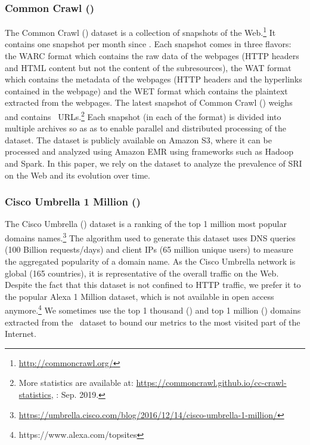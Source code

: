 \documentclass[sigconf,table]{acmart}
\begin{document}
\subsubsection{Common Crawl (\CC)}

The Common Crawl (\CC) dataset is a collection of snapshots of the Web.\footnote{\url{http://commoncrawl.org/}}
It contains one snapshot per month since \EarliestCCDate. Each snapshot comes in three flavors: the WARC format which contains the raw data of the webpages (HTTP headers and HTML content but not the content of the subresources), the WAT format which contains the metadata of the webpages (HTTP headers and the hyperlinks contained in the webpage) and the WET format which contains the plaintext extracted from the webpages.
The latest snapshot of Common Crawl (\LatestCCDate) weighs \LatestCCSize and contains \LatestCCNbURLS~URLs.\footnote{More statistics are available at: \url{https://commoncrawl.github.io/cc-crawl-statistics}, \lastvisited: Sep. 2019.}
Each snapshot (in each of the format) is divided into multiple archives so as as to enable parallel and distributed processing of the dataset. The \CC dataset is publicly available on Amazon S3, where it can be processed and analyzed using Amazon EMR using frameworks such as Hadoop and Spark.
In this paper, we rely on the \CC dataset to analyze the prevalence of SRI on the Web and its evolution over time.

\subsubsection{Cisco Umbrella 1 Million (\Cisco)}

The Cisco Umbrella (\Cisco) dataset is a ranking of the top 1 million most popular domains names.\footnote{\url{https://umbrella.cisco.com/blog/2016/12/14/cisco-umbrella-1-million/}}
The algorithm used to generate this dataset uses DNS queries (100 Billion requests/days) and client IPs (65 million unique users) to measure the aggregated popularity of a domain name.
As the Cisco Umbrella network is global (165 countries), it is representative of the overall traffic on the Web.
Despite the fact that this dataset is not confined to HTTP traffic, we prefer it to the popular Alexa 1 Million dataset, which is not available in open access anymore.\footnote{https://www.alexa.com/topsites}
We sometimes use the top 1 thousand (\TopK) and top 1 million (\TopM) domains extracted from the \Cisco\ dataset to bound our metrics to the most visited part of the Internet.
\end{document}

